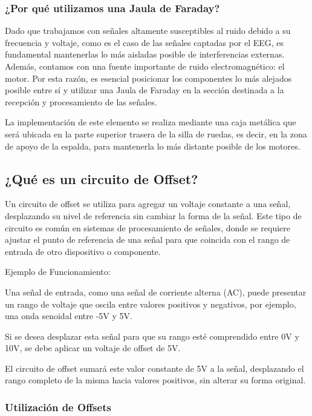 \documentclass{article}
\begin{document}
\subsubsection{¿Por qué utilizamos una Jaula de Faraday?}
Dado que trabajamos con señales altamente susceptibles al ruido debido a su frecuencia y voltaje, como es el caso de las señales captadas por el EEG, es fundamental mantenerlas lo más aisladas posible de interferencias externas. Además, contamos con una fuente importante de ruido electromagnético: el motor. Por esta razón, es esencial posicionar los componentes lo más alejados posible entre sí y utilizar una Jaula de Faraday en la sección destinada a la recepción y procesamiento de las señales.

La implementación de este elemento se realiza mediante una caja metálica que será ubicada en la parte superior trasera de la silla de ruedas, es decir, en la zona de apoyo de la espalda, para mantenerla lo más distante posible de los motores.


\subsection{¿Qué es un circuito de Offset?}

Un circuito de offset se utiliza para agregar un voltaje constante a una señal, desplazando su nivel de referencia sin cambiar la forma de la señal. Este tipo de circuito es común en sistemas de procesamiento de señales, donde se requiere ajustar el punto de referencia de una señal para que coincida con el rango de entrada de otro dispositivo o componente.

Ejemplo de Funcionamiento:

Una señal de entrada, como una señal de corriente alterna (AC), puede presentar un rango de voltaje que oscila entre valores positivos y negativos, por ejemplo, una onda senoidal entre -5V y 5V.

Si se desea desplazar esta señal para que su rango esté comprendido entre 0V y 10V, se debe aplicar un voltaje de offset de 5V.

El circuito de offset sumará este valor constante de 5V a la señal, desplazando el rango completo de la misma hacia valores positivos, sin alterar su forma original.

\subsubsection{Utilización de Offsets}
\end{document}
